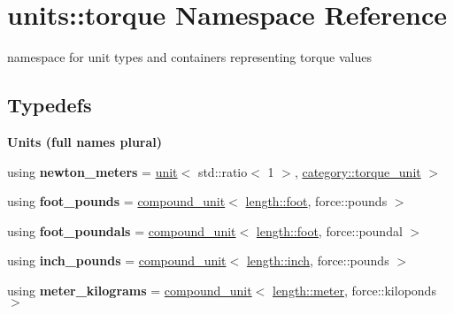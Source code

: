 \hypertarget{namespaceunits_1_1torque}{}\section{units\+:\+:torque Namespace Reference}
\label{namespaceunits_1_1torque}


namespace for unit types and containers representing torque values  


\subsection*{Typedefs}
\begin{Indent}{\bf Units (full names plural)}\par
\begin{DoxyCompactItemize}
\item 
\hypertarget{namespaceunits_1_1torque_a3a8795e495ad27d212b0f65f71bf2e7e}{}using {\bfseries newton\+\_\+meters} = \hyperlink{structunits_1_1unit}{unit}$<$ std\+::ratio$<$ 1 $>$, \hyperlink{namespaceunits_1_1category_a751792d53b9d7b10e926c65f0e0e2980}{category\+::torque\+\_\+unit} $>$\label{namespaceunits_1_1torque_a3a8795e495ad27d212b0f65f71bf2e7e}

\item 
\hypertarget{namespaceunits_1_1torque_a6497d29bc994cafc8f4a3131752d101e}{}using {\bfseries foot\+\_\+pounds} = \hyperlink{group___unit_types_ga9c3f6f077dc894620e1ed8358442a8f1}{compound\+\_\+unit}$<$ \hyperlink{structunits_1_1unit}{length\+::foot}, force\+::pounds $>$\label{namespaceunits_1_1torque_a6497d29bc994cafc8f4a3131752d101e}

\item 
\hypertarget{namespaceunits_1_1torque_acdaf80a1cf29c674f13f90b7461b597f}{}using {\bfseries foot\+\_\+poundals} = \hyperlink{group___unit_types_ga9c3f6f077dc894620e1ed8358442a8f1}{compound\+\_\+unit}$<$ \hyperlink{structunits_1_1unit}{length\+::foot}, force\+::poundal $>$\label{namespaceunits_1_1torque_acdaf80a1cf29c674f13f90b7461b597f}

\item 
\hypertarget{namespaceunits_1_1torque_a3618fc6118ebb2f7f493337671fdadc2}{}using {\bfseries inch\+\_\+pounds} = \hyperlink{group___unit_types_ga9c3f6f077dc894620e1ed8358442a8f1}{compound\+\_\+unit}$<$ \hyperlink{structunits_1_1unit}{length\+::inch}, force\+::pounds $>$\label{namespaceunits_1_1torque_a3618fc6118ebb2f7f493337671fdadc2}

\item 
\hypertarget{namespaceunits_1_1torque_a680b5830c4c5b39a67ee3c11efbda42d}{}using {\bfseries meter\+\_\+kilograms} = \hyperlink{group___unit_types_ga9c3f6f077dc894620e1ed8358442a8f1}{compound\+\_\+unit}$<$ \hyperlink{structunits_1_1unit}{length\+::meter}, force\+::kiloponds $>$\label{namespaceunits_1_1torque_a680b5830c4c5b39a67ee3c11efbda42d}

\end{DoxyCompactItemize}
\end{Indent}
